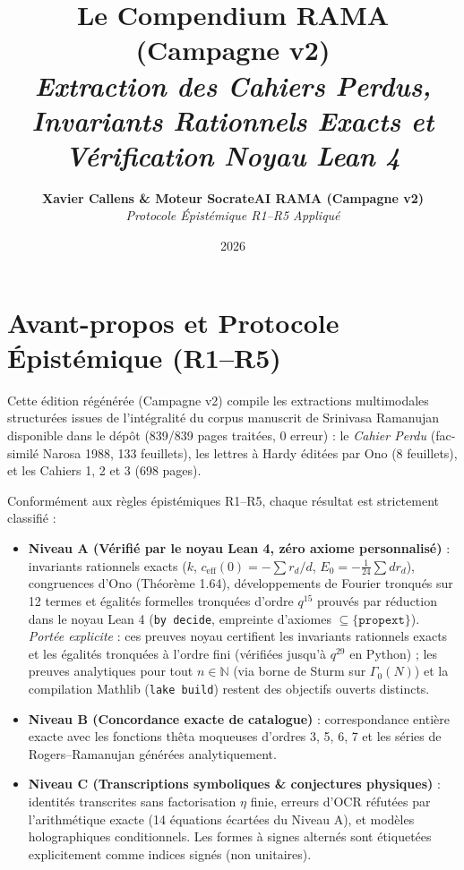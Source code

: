 \documentclass[11pt,twoside,openright]{book}
\title{\Huge\textbf{Le Compendium RAMA (Campagne v2)}\\[0.5em] \large\textit{Extraction des Cahiers Perdus, Invariants Rationnels Exacts et Vérification Noyau Lean 4}}
\author{\textbf{Xavier Callens \& Moteur SocrateAI RAMA (Campagne v2)} \\ \textit{Protocole Épistémique R1--R5 Appliqué}}
\date{2026}
\begin{document}
\frontmatter
\maketitle

\chapter*{Avant-propos et Protocole Épistémique (R1--R5)}
Cette édition régénérée (Campagne v2) compile les extractions multimodales structurées issues de l'intégralité du corpus manuscrit de Srinivasa Ramanujan disponible dans le dépôt (839/839 pages traitées, 0 erreur) : le \textit{Cahier Perdu} (fac-similé Narosa 1988, 133 feuillets), les lettres à Hardy éditées par Ono (8 feuillets), et les Cahiers 1, 2 et 3 (698 pages).

Conformément aux règles épistémiques R1--R5, chaque résultat est strictement classifié :
\begin{itemize}
  \item \textbf{Niveau A (Vérifié par le noyau Lean 4, zéro axiome personnalisé)} : invariants rationnels exacts ($k$, $c_{\text{eff}}(0) = -\sum r_d/d$, $E_0 = -\frac{1}{24}\sum d r_d$), congruences d'Ono (Théorème 1.64), développements de Fourier tronqués sur 12 termes et égalités formelles tronquées d'ordre $q^{15}$ prouvés par réduction dans le noyau Lean 4 (\texttt{by decide}, empreinte d'axiomes $\subseteq \{\texttt{propext}\}$). \textit{Portée explicite} : ces preuves noyau certifient les invariants rationnels exacts et les égalités tronquées à l'ordre fini (vérifiées jusqu'à $q^{29}$ en Python) ; les preuves analytiques pour tout $n \in \mathbb{N}$ (via borne de Sturm sur $\Gamma_0(N)$) et la compilation Mathlib (\texttt{lake build}) restent des objectifs ouverts distincts.
  \item \textbf{Niveau B (Concordance exacte de catalogue)} : correspondance entière exacte avec les fonctions thêta moqueuses d'ordres 3, 5, 6, 7 et les séries de Rogers--Ramanujan générées analytiquement.
  \item \textbf{Niveau C (Transcriptions symboliques \& conjectures physiques)} : identités transcrites sans factorisation $\eta$ finie, erreurs d'OCR réfutées par l'arithmétique exacte (14 équations écartées du Niveau A), et modèles holographiques conditionnels. Les formes à signes alternés sont étiquetées explicitement comme indices signés (non unitaires).
\end{itemize}
\tableofcontents
\mainmatter
\end{document}
